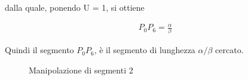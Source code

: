 dalla quale, ponendo U = 1, si ottiene

\begin{align*}
P_{0}P_{6} = \frac{\alpha}{\beta}
\end{align*}

Quindi il segmento $P_{0}P_{6}$, è il segmento di lunghezza $\alpha / \beta$ cercato. \\ 

\begin{figure}%
\begin{center}%
\end{center}%
\caption{Manipolazione di segmenti 2}%
\end{figure}

